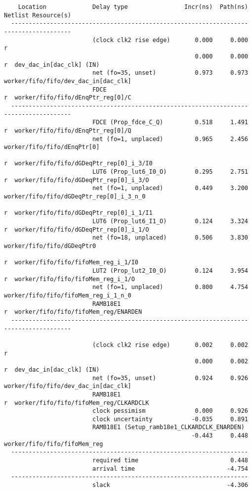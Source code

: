 \documentclass{article}
\begin{document}
\begin{lstlisting}
    Location             Delay type                Incr(ns)  Path(ns)    Netlist Resource(s)
  -------------------------------------------------------------------    -------------------
                         (clock clk2 rise edge)       0.000     0.000 r
                                                      0.000     0.000 r  dev_dac_in[dac_clk] (IN)
                         net (fo=35, unset)           0.973     0.973    worker/fifo/fifo/dev_dac_in[dac_clk]
                         FDCE                                         r  worker/fifo/fifo/dEnqPtr_reg[0]/C
  -------------------------------------------------------------------    -------------------
                         FDCE (Prop_fdce_C_Q)         0.518     1.491 r  worker/fifo/fifo/dEnqPtr_reg[0]/Q
                         net (fo=1, unplaced)         0.965     2.456    worker/fifo/fifo/dEnqPtr[0]
                                                                      r  worker/fifo/fifo/dGDeqPtr_rep[0]_i_3/I0
                         LUT6 (Prop_lut6_I0_O)        0.295     2.751 r  worker/fifo/fifo/dGDeqPtr_rep[0]_i_3/O
                         net (fo=1, unplaced)         0.449     3.200    worker/fifo/fifo/dGDeqPtr_rep[0]_i_3_n_0
                                                                      r  worker/fifo/fifo/dGDeqPtr_rep[0]_i_1/I1
                         LUT6 (Prop_lut6_I1_O)        0.124     3.324 r  worker/fifo/fifo/dGDeqPtr_rep[0]_i_1/O
                         net (fo=18, unplaced)        0.506     3.830    worker/fifo/fifo/dGDeqPtr0
                                                                      r  worker/fifo/fifo/fifoMem_reg_i_1/I0
                         LUT2 (Prop_lut2_I0_O)        0.124     3.954 r  worker/fifo/fifo/fifoMem_reg_i_1/O
                         net (fo=1, unplaced)         0.800     4.754    worker/fifo/fifo/fifoMem_reg_i_1_n_0
                         RAMB18E1                                     r  worker/fifo/fifo/fifoMem_reg/ENARDEN
  -------------------------------------------------------------------    -------------------

                         (clock clk2 rise edge)       0.002     0.002 r
                                                      0.000     0.002 r  dev_dac_in[dac_clk] (IN)
                         net (fo=35, unset)           0.924     0.926    worker/fifo/fifo/dev_dac_in[dac_clk]
                         RAMB18E1                                     r  worker/fifo/fifo/fifoMem_reg/CLKARDCLK
                         clock pessimism              0.000     0.926
                         clock uncertainty           -0.035     0.891
                         RAMB18E1 (Setup_ramb18e1_CLKARDCLK_ENARDEN)
                                                     -0.443     0.448    worker/fifo/fifo/fifoMem_reg
  -------------------------------------------------------------------
                         required time                          0.448
                         arrival time                          -4.754
  -------------------------------------------------------------------
                         slack                                 -4.306




\end{lstlisting}
\end{document}
